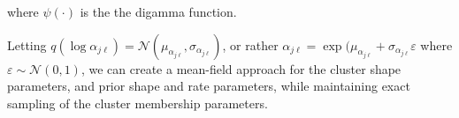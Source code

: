 where $\psi(\cdot)$ is the the digamma function.

Letting $q(\log \alpha_{j\ell}) = \mathcal{N}(\mu_{\alpha_{j\ell}},\sigma_{\alpha_{j\ell}})$, 
    or rather $\alpha_{j\ell} = \exp(\mu_{\alpha_{j\ell}} + \sigma_{\alpha_{j\ell}}\varepsilon$ 
    where $\varepsilon \sim \mathcal{N}(0,1)$, we can create a mean-field approach for the
    cluster shape parameters, and prior shape and rate parameters, while maintaining exact
    sampling of the cluster membership parameters.
